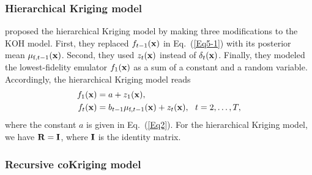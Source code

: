\documentclass[iicol,sn-basic]{sn-jnl}%
\theoremstyle{thmstyleone}%
\theoremstyle{thmstyletwo}
\theoremstyle{thmstylethree}
\begin{document}
\begin{linenumbers}
\subsubsection{Hierarchical Kriging model}\label{Sec522}

\cite{Han2012} proposed the hierarchical Kriging model by making three modifications to the KOH model.
First, they replaced $f_{t-1}({\bf x})$ in Eq.~(\ref{Eq5-1}) with its posterior mean $\mu_{\text{f},t-1}({\bf x})$.
Second, they used $z_{t}({\bf x})$ instead of $\delta_{t}({\bf x})$.
Finally, they modeled the lowest-fidelity emulator $f_1({\bf x})$ as a sum of a constant and a random variable.
Accordingly, the hierarchical Kriging model reads
\begin{subequations}\label{Eq12}
	\begin{align}
		f_1({\bf x}) & = a + z_1({\bf x}) 
		\label{Eq12-1},\\
		f_t({\bf x}) & =
		b_{t-1} \mu_{\text{f},t-1}({\bf x}) + z_{t}({\bf x}), \ \  t=2,\dots,T
		\label{Eq12-2},
	\end{align}
\end{subequations}
where the constant $a$ is given in Eq.~(\ref{Eq2}).
For the hierarchical Kriging model, we have ${\bf R}={\bf I}$, where ${\bf I}$ is the identity matrix.

\subsubsection{Recursive coKriging model}\label{Sec523}


\end{linenumbers}
\end{document}
